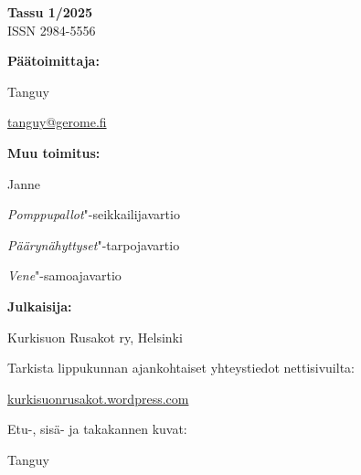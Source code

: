 \documentclass[10pt,finnish,a5paper]{scrartcl}
\begin{document}
{\color{white}
\noindent \textbf{Tassu 1/2025} \\
\noindent ISSN 2984-5556}

\vfill

\noindent\textbf{Päätoimittaja:}

Tanguy

\href{mailto:tanguy@gerome.fi}{tanguy@gerome.fi}

\medskip

\noindent\textbf{Muu toimitus:}

Janne

\textit{Pomppupallot}"-seikkailijavartio

\textit{Päärynähyttyset}"-tarpojavartio

\textit{Vene}"-samoajavartio

\medskip

\noindent\textbf{Julkaisija:}

Kurkisuon Rusakot ry, Helsinki

\medskip

\noindent Tarkista lippukunnan ajankohtaiset yhteystiedot nettisivuilta:

\href{https://kurkisuonrusakot.wordpress.com/}{kurkisuonrusakot.wordpress.com}

\medskip

\noindent Etu-, sisä- ja takakannen kuvat:

Tanguy

\vspace{-0.64cm}

\tableofcontents

















% 
\end{document}
